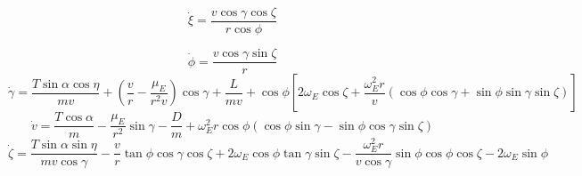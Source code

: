 \begin{equation}
\dot{\xi} = \frac{v\cos \gamma \cos \zeta}{r \cos \phi}
\end{equation}

\begin{equation}
\dot{\phi} = \frac{v\cos\gamma\sin\zeta}{r}
\end{equation}
\begin{equation}
\dot{\gamma} = \frac{T\sin\alpha \cos\eta}{mv} + (\frac{v}{r}-\frac{\mu_E}{r^2 v})\cos\gamma + \frac{L}{mv}
+ \cos\phi[2\omega_E \cos\zeta + \frac{\omega_E^2 r}{v}(\cos\phi\cos\gamma+\sin\phi\sin\gamma\sin\zeta)]
\end{equation}
\begin{equation}
\dot{v} = \frac{T\cos\alpha}{m}-\frac{\mu_E}{r^2}\sin\gamma - \frac{D}{m}
+ \omega_E^2 r\cos\phi(\cos\phi\sin\gamma-\sin\phi\cos\gamma\sin\zeta)
\end{equation}
\begin{equation}\label{eq:heading}
\dot{\zeta} = \frac{T\sin\alpha \sin\eta}{mv \cos \gamma}-\frac{v}{r}\tan\phi\cos\gamma\cos\zeta +2\omega_E\cos\phi\tan\gamma\sin\zeta - \frac{\omega_E^2 r}{v\cos\gamma}\sin\phi\cos\phi\cos\zeta-2\omega_E\sin\phi 
\end{equation}



